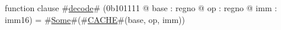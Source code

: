 function clause #\hyperref[zdecode]{decode}# (0b101111 @ base : regno @ op : regno @ imm : imm16) =
  #\hyperref[zSome]{Some}#(#\hyperref[zCACHE]{CACHE}#(base, op, imm))
